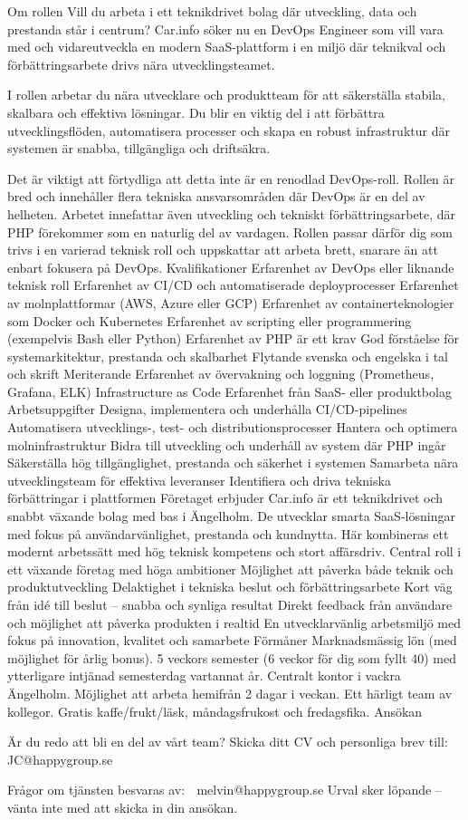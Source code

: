 
Om rollen
Vill du arbeta i ett teknikdrivet bolag där utveckling, data och prestanda står i centrum? Car.info söker nu en DevOps Engineer som vill vara med och vidareutveckla en modern SaaS-plattform i en miljö där teknikval och förbättringsarbete drivs nära utvecklingsteamet.

I rollen arbetar du nära utvecklare och produktteam för att säkerställa stabila, skalbara och effektiva lösningar. Du blir en viktig del i att förbättra utvecklingsflöden, automatisera processer och skapa en robust infrastruktur där systemen är snabba, tillgängliga och driftsäkra.

Det är viktigt att förtydliga att detta inte är en renodlad DevOps-roll. Rollen är bred och innehåller flera tekniska ansvarsområden där DevOps är en del av helheten. Arbetet innefattar även utveckling och tekniskt förbättringsarbete, där PHP förekommer som en naturlig del av vardagen. Rollen passar därför dig som trivs i en varierad teknisk roll och uppskattar att arbeta brett, snarare än att enbart fokusera på DevOps.
Kvalifikationer
Erfarenhet av DevOps eller liknande teknisk roll
Erfarenhet av CI/CD och automatiserade deployprocesser
Erfarenhet av molnplattformar (AWS, Azure eller GCP)
Erfarenhet av containerteknologier som Docker och Kubernetes
Erfarenhet av scripting eller programmering (exempelvis Bash eller Python)
Erfarenhet av PHP är ett krav
God förståelse för systemarkitektur, prestanda och skalbarhet
Flytande svenska och engelska i tal och skrift
Meriterande
Erfarenhet av övervakning och loggning (Prometheus, Grafana, ELK)
Infrastructure as Code
Erfarenhet från SaaS- eller produktbolag
Arbetsuppgifter
Designa, implementera och underhålla CI/CD-pipelines
Automatisera utvecklings-, test- och distributionsprocesser
Hantera och optimera molninfrastruktur
Bidra till utveckling och underhåll av system där PHP ingår
Säkerställa hög tillgänglighet, prestanda och säkerhet i systemen
Samarbeta nära utvecklingsteam för effektiva leveranser
Identifiera och driva tekniska förbättringar i plattformen
Företaget erbjuder
Car.info är ett teknikdrivet och snabbt växande bolag med bas i Ängelholm. De utvecklar smarta SaaS-lösningar med fokus på användarvänlighet, prestanda och kundnytta. Här kombineras ett modernt arbetssätt med hög teknisk kompetens och stort affärsdriv.
Central roll i ett växande företag med höga ambitioner
Möjlighet att påverka både teknik och produktutveckling
Delaktighet i tekniska beslut och förbättringsarbete
Kort väg från idé till beslut – snabba och synliga resultat
Direkt feedback från användare och möjlighet att påverka produkten i realtid
En utvecklarvänlig arbetsmiljö med fokus på innovation, kvalitet och samarbete
Förmåner
Marknadsmässig lön (med möjlighet för årlig bonus).
5 veckors semester (6 veckor för dig som fyllt 40) med ytterligare intjänad semesterdag vartannat år.
Centralt kontor i vackra Ängelholm.
Möjlighet att arbeta hemifrån 2 dagar i veckan.
Ett härligt team av kollegor.
Gratis kaffe/frukt/läsk, måndagsfrukost och fredagsfika.
Ansökan


Är du redo att bli en del av vårt team?
Skicka ditt CV och personliga brev till:
📩 JC@happygroup.se

Frågor om tjänsten besvaras av:
📧 melvin@happygroup.se
Urval sker löpande – vänta inte med att skicka in din ansökan.